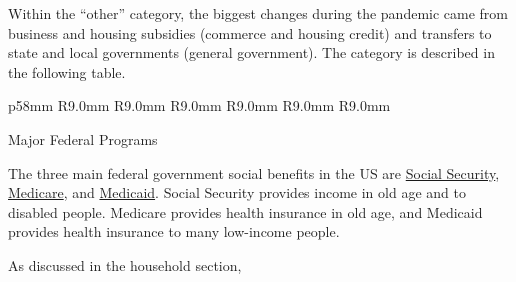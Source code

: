\newpage
\begin{minipage}{0.76\textwidth}  
\small 

Within the ``other'' category, the biggest changes during the pandemic came from business and housing subsidies (commerce and housing credit) and transfers to state and local governments (general government). The category is described in the following table. 
\vspace{1mm}

\vspace*{-5mm}

{\footnotesize {} \setlength{\tabcolsep}{1.5pt} \color{black!90}
{\renewcommand{\arraystretch}{1.65}
\hspace*{-1mm} \begin{tabular}{p{58mm} R{9.0mm} R{9.0mm} R{9.0mm} R{9.0mm} R{9.0mm} R{9.0mm}}
		 \hline
	\end{tabular}
}}

\vspace{-1.5mm}
\end{minipage}
\newpage
\begin{minipage}{0.76\textwidth}      
\normalsize Major Federal Programs
\vspace{-1mm}

\small The three main federal government social benefits in the US are \href{https://www.ssa.gov/about-ssa}{Social Security}, \href{https://www.medicare.gov/what-medicare-covers/your-medicare-coverage-choices/whats-medicare}{Medicare}, and \href{https://www.medicaid.gov/medicaid/index.html}{Medicaid}. Social Security provides income in old age and to disabled people. Medicare provides health insurance in old age, and Medicaid provides health insurance to many low-income people. 

As discussed in the household section,  
\end{minipage}
\vspace{1mm}

